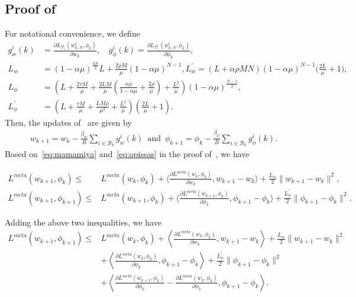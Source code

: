 \documentclass{osudissert96}
\begin{document}
\subsection*{Proof of~ }
For notational convenience, we define
\begin{align}\label{eq:ddfinetes}
g_{w}^i(k) &=  \frac{\partial L_{\mathcal{D}_i}( w^i_{k,N},\phi_k)}{\partial {w_k}},\quad g_{\phi}^i(k)  = \frac{\partial L_{\mathcal{D}_i}( w^i_{k,N},\phi_k)}{\partial {\phi_k}}, \nonumber
\\L_w&=(1-\alpha\mu)^{\frac{3N}{2}} L+ \frac{2\rho M}{\mu}(1-\alpha\mu)^{N-1},L_w^\prime= (L+\alpha\rho MN)(1-\alpha\mu)^{N-1}\Big(\frac{2L}{\mu}+1\Big),\nonumber
\\  L_\phi&= \left(  L+\frac{2\tau M}{\mu}+ \frac{2LM}{\mu} \left( \frac{\alpha\rho}{1-\alpha\mu}+\frac{2\rho}{\mu}\right) +\frac{L^2}{\mu} \right)(1-\alpha\mu)^{\frac{N-1}{2}}, \nonumber
\\L_\phi^\prime &=\left(L+\frac{\tau M}{\mu} + \frac{ LM\rho}{\mu^2}+\frac{L^2}{\mu} \right)\left(\frac{2L}{\mu}+1\right).
\end{align}
Then, the updates of~ are given by 
\begin{align}\label{alg:sgdpf}
w_{k+1}=  w_{k} - \frac{\beta_w}{B}\sum_{i\in\mathcal{B}_k} g_{w}^i(k)\,\text{ and }\, \phi_{k+1}= \phi_{k} - \frac{\beta_\phi}{B}\sum_{i\in\mathcal{B}_k}g_{\phi}^i(k).
\end{align}
Based on~\cref{eq:mamamiya} and~\cref{eq:opissas} in the proof of~, we have 
\begin{small}
\begin{align*}
L^{meta}(w_{k+1},\phi_k) \leq & L^{meta}(w_k,\phi_k) + \big\langle \frac{\partial L^{meta}(w_k,\phi_k)}{\partial w_k}, w_{k+1}-w_k  \big\rangle + \frac{L_w}{2} \|w_{k+1}-w_k\|^2, \nonumber
\\ L^{meta}(w_{k+1},\phi_{k+1}) \leq & L^{meta}(w_{k+1},\phi_k) + \big\langle \frac{\partial L^{meta}(w_{k+1},\phi_k)}{\partial \phi_k}, \phi_{k+1}-\phi_k  \big\rangle + \frac{L^\prime_\phi}{2} \|\phi_{k+1}-\phi_k\|^2.
\end{align*}
\end{small}
\hspace{-0.12cm}Adding the above two inequalities, we have
\begin{align}\label{eq:gg1anilscasa}
L^{meta}(w_{k+1},\phi_{k+1}) \leq&  L^{meta}(w_k,\phi_k) + \left\langle \frac{\partial L^{meta}(w_k,\phi_k)}{\partial w_k}, w_{k+1}-w_k  \right\rangle + \frac{L_w}{2} \|w_{k+1}-w_k\|^2 \nonumber
\\ &+\left\langle \frac{\partial L^{meta}(w_{k},\phi_k)}{\partial \phi_k}, \phi_{k+1}-\phi_k  \right\rangle + \frac{L_\phi^\prime}{2} \|\phi_{k+1}-\phi_k\|^2  \nonumber
\\&+\left\langle \frac{\partial L^{meta}(w_{k+1},\phi_k)}{\partial \phi_k}-\frac{\partial L^{meta}(w_{k},\phi_k)}{\partial \phi_k}, \phi_{k+1}-\phi_k  \right\rangle. 
\end{align}
\end{document}

